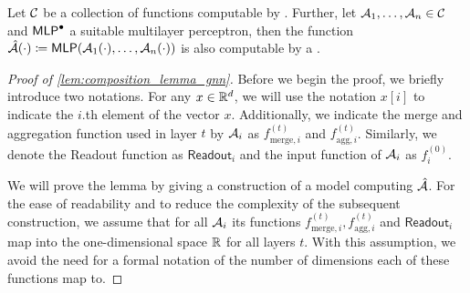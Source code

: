 \begin{lemma}\label{lem:composition_lemma_gnn}
    Let $\mathcal{C}$ be a collection of functions computable by \gnns. Further, let  $\mathcal{A}_1, \dots , \mathcal{A}_n \in \mathcal{C}$ and $\textsf{MLP}^\bullet$ a suitable multilayer perceptron, then the function $\hat{\mathcal{A}}(\cdot) \coloneqq \textsf{MLP}(\mathcal{A}_1(\cdot), \dots, \mathcal{A}_n(\cdot))$ is also computable by a \gnn.
\end{lemma}

\begin{proof}[Proof of \cref{lem:composition_lemma_gnn}]
    Before we begin the proof, we briefly introduce two notations. For any $x \in \mathbb{R}^d$, we will use the notation $x[i]$ to indicate the $i$.th element of the vector $x$. Additionally, we indicate the merge and aggregation function used in layer $t$ by $\mathcal{A}_i$ as $f^{(t)}_{\text{merge}, i}$ and $f^{(t)}_{\text{agg}, i}$. Similarly, we denote the \textsf{Readout} function as $\textsf{Readout}_i$ and the input function of $\mathcal{A}_i$ as $f^{(0)}_i$.
    
    We will prove the lemma by giving a construction of a \gnn model computing $\hat{\mathcal{A}}$. For the ease of readability and to reduce the complexity of the subsequent construction, we assume that for all $\mathcal{A}_i$ its functions $f^{(t)}_{\text{merge}, i}, f^{(t)}_{\text{agg}, i}$ and $\textsf{Readout}_i$ map into the one-dimensional space $\mathbb{R}$ for all layers $t$. With this assumption, we avoid the need for a formal notation of the number of dimensions each of these functions map to.


\end{proof}
